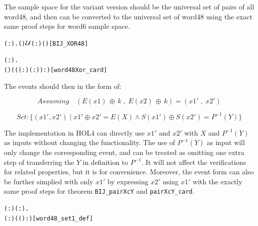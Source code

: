 \documentclass{article}
\begin{document}
The sample space for the variant version should be the universal set of pairs of all word48, and then can be converted to the universal set of
word48 using the exact same proof steps for word6 sample space.

\begin{alltt}
   \HOLTokenTurnstile{} \HOLSymConst{\HOLTokenForall{}}( :).  ( ) \ensuremath{{\cal{U}}}(:) ( )\hfill{[BIJ_XOR48]}
\end{alltt}

\begin{alltt}
   \HOLTokenTurnstile{} \HOLSymConst{\HOLTokenForall{}}( :).
      ( ) \HOLSymConst{=} ((( :) \HOLSymConst{\HOLTokenExp{}} ( :)) :)\hfill{[word48Xor_card]}
\end{alltt}

The events should then in the form of:

\begin{equation*}
   Assuming \quad(E(x1)\,\oplus\, k\;,\; E(x2)\,\oplus\, k)= (x1'\;,\;x2')
\end{equation*}

\begin{equation*}
Set: \{(x1', x2') \;|\; x1' \oplus x2' = E(X) \land S(x1') \oplus S(x2')= P^{-1}(Y)\}
\end{equation*}

The implementation in HOL4 can directly use $x1'$ and $x2'$ with $X$ and $P^{-1}(Y)$ as inputs without changing the
functionality. The use of $P^{-1}(Y)$ as input will only change the corresponding event,
and can be treated as omitting one extra step of transferring the $Y$ in definition to $P^{-1}$. It will not affect the
verifications for related
properties, but it is for convenience. Moreover, the event form can also be further simplied with only $x1'$ by expressing
$x2'$ using $x1'$ with the exactly same proof steps for theorem \verb|BIJ_pairXcY| and \verb|pairXcY_card|.

\begin{alltt}
\HOLTokenTurnstile{} \HOLSymConst{\HOLTokenForall{}}( :) ( :).
        \HOLSymConst{=}
     \HOLTokenLeftbrace{} \HOLTokenBar{} (  :) \HOLSymConst{\HOLTokenEor{}} ( ( \HOLSymConst{\HOLTokenEor{}}  ) :) \HOLSymConst{=} \HOLTokenRightbrace{}\hfill{[word48_set1_def]}
\end{alltt}
\end{document}
